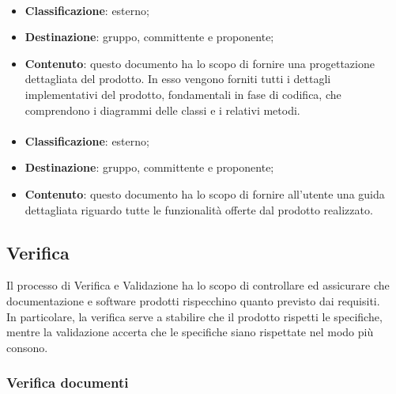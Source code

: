		\paragraph{\DDP}
		\begin{itemize}
			\item \textbf{Classificazione}: esterno;
			\item \textbf{Destinazione}: gruppo, committente e proponente;
			\item \textbf{Contenuto}: questo documento ha lo scopo di fornire una progettazione dettagliata del
			prodotto. In esso vengono forniti tutti i dettagli implementativi del prodotto, fondamentali in fase di codifica, che comprendono i diagrammi delle classi e i relativi metodi.
		\end{itemize}
	
		\paragraph{\MU}
		\begin{itemize}
			\item \textbf{Classificazione}: esterno;
			\item \textbf{Destinazione}: gruppo, committente e proponente;
			\item \textbf{Contenuto}: questo documento ha lo scopo di fornire all'utente una guida dettagliata riguardo tutte le funzionalità offerte dal prodotto realizzato.
		\end{itemize}
	\newpage
	\subsection{Verifica}
	Il processo di Verifica e Validazione ha lo scopo di controllare ed assicurare che documentazione e software prodotti rispecchino quanto previsto dai requisiti.\\
	In particolare, la verifica serve a stabilire che il prodotto rispetti le specifiche, mentre la validazione accerta che le specifiche siano rispettate nel modo più consono.

		\subsubsection{Verifica documenti}
		
